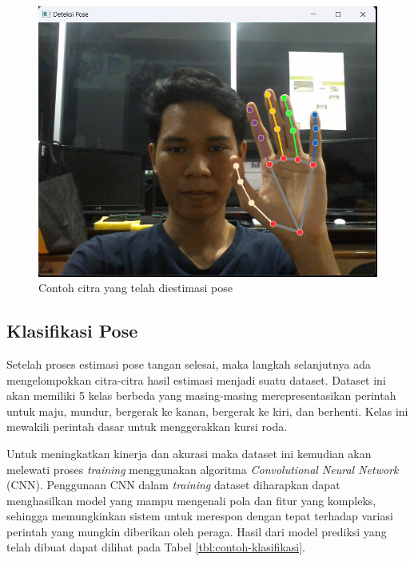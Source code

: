 \begin{figure} [ht] \centering
    \includegraphics[scale=0.9]{gambar/bab3/EstimasiPose.png}
    \caption{Contoh citra yang telah diestimasi pose}
    \label{fig:contoh citra yang telah diestimasi pose}
\end{figure}

\subsection{Klasifikasi Pose}
Setelah proses estimasi pose tangan selesai, maka langkah selanjutnya ada mengelompokkan citra-citra hasil estimasi menjadi suatu dataset. Dataset ini akan memiliki 5 kelas berbeda yang masing-masing merepresentasikan perintah untuk maju, mundur, bergerak ke kanan, bergerak ke kiri, dan berhenti. Kelas ini mewakili perintah dasar untuk menggerakkan kursi roda. 

Untuk meningkatkan kinerja dan akurasi maka dataset ini kemudian akan melewati proses \emph{training} menggunakan algoritma \emph{Convolutional Neural Network} (CNN). Penggunaan CNN dalam \emph{training} dataset diharapkan dapat menghasilkan model yang mampu mengenali pola dan fitur yang kompleks, sehingga memungkinkan sistem untuk merespon dengan tepat terhadap variasi perintah yang mungkin diberikan oleh peraga. Hasil dari model prediksi yang telah dibuat dapat dilihat pada Tabel \ref{tbl:contoh-klasifikasi}.

